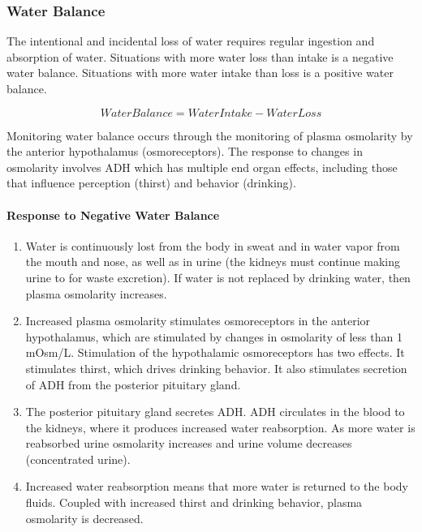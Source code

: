 \subsubsection{Water Balance}

The intentional and incidental loss of water requires regular ingestion and absorption of water. Situations with more water loss than intake is a negative water balance. Situations with more water intake than loss is a positive water balance.

\begin{equation}
    Water Balance = Water Intake - Water Loss
    \label{water_balance}
\end{equation}

Monitoring water balance occurs through the monitoring of plasma osmolarity by the anterior hypothalamus (osmoreceptors). The response to changes in osmolarity involves ADH which has multiple end organ effects, including those that influence perception (thirst) and behavior (drinking). 

\paragraph{Response to Negative Water Balance}

\begin{enumerate}
\item Water is continuously lost from the body in sweat and in water vapor from the mouth and nose, as well as in urine (the kidneys must continue making urine to for waste excretion). If water is not replaced by drinking water, then plasma osmolarity increases. 
\item Increased plasma osmolarity stimulates osmoreceptors in the anterior hypothalamus, which are stimulated by changes in osmolarity of less than 1 mOsm/L. Stimulation of the hypothalamic osmoreceptors has two effects. It stimulates thirst, which drives drinking behavior. It also stimulates secretion of ADH from the posterior pituitary gland. 
\item The posterior pituitary gland secretes ADH. ADH circulates in the blood to the kidneys, where it produces increased water reabsorption. As more water is reabsorbed urine osmolarity increases and urine volume decreases (concentrated urine). 
\item Increased water reabsorption means that more water is returned to the body fluids. Coupled with increased thirst and drinking behavior, plasma osmolarity is decreased.
\end{enumerate}

